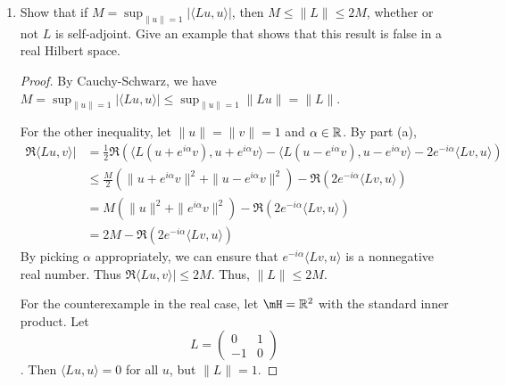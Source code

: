 \documentclass{article}
\begin{document}
\begin{enumerate}
\begin{proof}
For $\|u\| = \|v\| = 1$, we have
\begin{align*}
\Re \langle Lu, v \rangle & =  \frac 1 2 (\langle Lu, v \rangle + \langle v, Lu \rangle)
\\ & = \frac 1 2 (\langle Lu, v \rangle + \langle Lv, u \rangle)
\\ & = \frac 1 4  (\langle L(u + v), u + v\rangle -  \langle L(u - v), u - v \rangle)
\\ &  \le \frac 1 4 ( \|u + v\|^2 + \|u - v\|^2) \sup_{\|u\| = 1} | \langle L u, u \rangle |
\\ &  \le \frac 1 2 ( \|u\|^2 + \|v\|^2) \sup_{\|u\| = 1} | \langle L u, u \rangle |
\\ &  \le \frac 1 2 ( \|u\|^2 + \|v\|^2) \sup_{\|u\| = 1} | \langle L u, u \rangle |
\\ &  = \sup_{\|u\| = 1} | \langle L u, u \rangle |
\end{align*}
\end{proof}

\item Show that if $M = \sup_{\|u\| = 1} |\langle Lu, u \rangle|$, then $M \le \|L\| \le 2M$, whether or not $L$ is self-adjoint. Give an example that shows that this result is false in a real Hilbert space.


\begin{proof}
By Cauchy-Schwarz, we have $M = \sup_{\|u\| = 1} | \langle L u, u \rangle | \le 
\sup_{\|u\| = 1} \|L u\| = \|L \|$.

For the other inequality,  let $\|u\| = \|v\| = 1$ and $\alpha \in \mathbb{R}$.  By part (a),
\begin{align*}
\Re \langle Lu, v \rangle | &  = \frac 1 2 \Re( \langle L(u + e^{i \alpha} v), u + e^{i \alpha} v \rangle - 
\langle L(u - e^{i \alpha} v), u - e^{i \alpha} v \rangle
- 2 e^{-i \alpha} \langle Lv, u \rangle )
\\ & \le \frac  M 2 ( \|u + e^{i \alpha} v\|^2 + \|u - e^{i \alpha} v \|^2)  - \Re ( 2 e^{-i \alpha} \langle Lv, u \rangle )
\\ & =   M ( \|u\|^2 + \|e^{i \alpha} v \|^2)  - \Re ( 2 e^{-i \alpha} \langle Lv, u \rangle )
\\ & = 2 M  - \Re ( 2 e^{-i \alpha} \langle Lv, u \rangle )
\end{align*}
By picking $\alpha$ appropriately, we can ensure that $e^{-i \alpha} \langle Lv, u \rangle$ is a nonnegative real number.  Thus $\Re \langle Lu, v \rangle | \le 2M$.  Thus, $\|L\| \le 2M$.


For the counterexample in the real case, let $\mH = \R^2$ with the standard inner product.  Let 
$$L = \begin{pmatrix}
0 & 1
\\ -1  & 0
\end{pmatrix}$$.
Then $\langle Lu, u\rangle = 0$ for all $u$, but $\|L\| = 1$.
\end{proof}
\end{enumerate}
\end{document}
